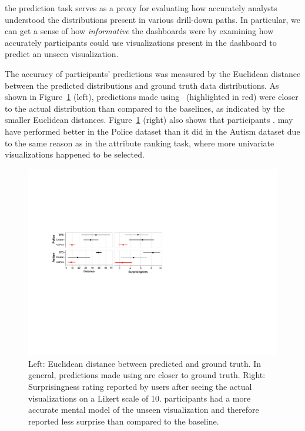 \npar {} the prediction task serves as a proxy for evaluating how accurately analysts understood the distributions present in various drill-down paths. In particular, we can get a sense of how \emph{informative} the dashboards were by examining how accurately participants could use visualizations present in the dashboard to predict an unseen visualization.
\par The accuracy of participants' predictions was measured by the Euclidean distance between the predicted distributions and ground truth data distributions. As shown in Figure~\ref{fig:distance} (left), predictions made using \system\ (highlighted in red) were closer to the actual distribution than compared to the baselines, as indicated by the smaller Euclidean distances. Figure~\ref{fig:distance} (right) also shows that \system participants . \cluster may have performed better in the Police dataset than it did in the Autism dataset due to the same reason as in the attribute ranking task, where more univariate visualizations happened to be selected.
\begin{figure}[h!]
\centering
\includegraphics[width=0.95\linewidth]{figures/prediction_surprisingness_distance.pdf}
\caption{Left: Euclidean distance between predicted and ground truth. In general, predictions made using \system are closer to ground truth. Right: Surprisingness rating reported by users after seeing the actual visualizations on a Likert scale of 10. \system participants had a more accurate mental model of the unseen visualization and therefore reported less surprise than compared to the baseline.}
\label{fig:distance}
\end{figure}
